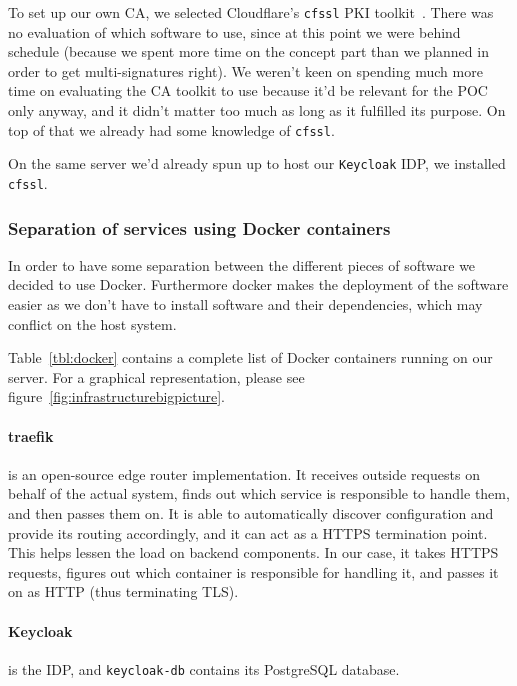 To set up our own \gls{CA}, we selected Cloudflare's \texttt{cfssl} \gls{PKI} toolkit~\cite{cfssl}.
There was no evaluation of which software to use,
since at this point we were behind schedule
(because we spent more time on the concept part than we planned in order to get multi-signatures right).
We weren't keen on spending much more time on evaluating the \gls{CA} toolkit to use because it'd be relevant for the \gls{POC} only anyway,
and it didn't matter too much as long as it fulfilled its purpose.
On top of that we already had some knowledge of \texttt{cfssl}.

On the same server we'd already spun up to host our \texttt{Keycloak} \gls{IDP},
we installed \texttt{cfssl}.

\subsubsection{Separation of services using Docker containers}

In order to have some separation between the different pieces of software we decided to use Docker.
Furthermore docker makes the deployment of the software easier as we don't have to install software and their dependencies, which may conflict on the host system.

Table~\ref{tbl:docker} contains a complete list of Docker containers running on our server.
For a graphical representation, please see figure~\ref{fig:infrastructurebigpicture}.

\paragraph{traefik} is an open-source edge router implementation.
It receives outside requests on behalf of the actual system,
finds out which service is responsible to handle them,
and then passes them on.
It is able to automatically discover configuration and provide its routing accordingly,
and it can act as a \gls{HTTPS} termination point.
This helps lessen the load on backend components.
In our case, it takes \gls{HTTPS} requests, figures out which container is responsible for handling it,
and passes it on as \gls{HTTP} (thus terminating \gls{TLS}).


\paragraph{Keycloak} is the \gls{IDP}, and \texttt{keycloak-db} contains its PostgreSQL database.

